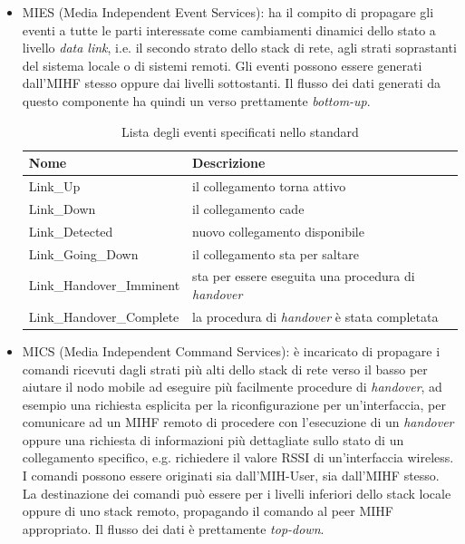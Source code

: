 \begin{itemize}
\item MIES (Media Independent Event Services): ha il compito di propagare gli eventi a tutte le parti interessate come cambiamenti dinamici dello stato a livello {\em data link}, i.e. il secondo strato dello stack di rete, agli strati soprastanti del sistema locale o di sistemi remoti. Gli eventi possono essere generati dall'MIHF stesso oppure dai livelli sottostanti. Il flusso dei dati generati da questo componente ha quindi un verso prettamente {\em bottom-up}.

\begin{table}[h]
\begin{tabular}{p{}|p{}}
\toprule
\textbf{Nome} & \textbf{Descrizione} \\
\midrule
Link\_Up & il collegamento torna attivo \\
\hline
Link\_Down & il collegamento cade  \\
\hline
Link\_Detected & nuovo collegamento disponibile \\
\hline
Link\_Going\_Down & il collegamento sta per saltare \\
\hline
Link\_Handover\_Imminent & sta per essere eseguita una procedura di {\em handover} \\
\hline
Link\_Handover\_Complete & la procedura di {\em handover} è stata completata \\
\bottomrule
\end{tabular}
\caption{Lista degli eventi specificati nello standard}
\label{mihevents}
\end{table}

\item MICS (Media Independent Command Services): è incaricato di propagare i comandi ricevuti dagli strati più alti dello stack di rete verso il basso per aiutare il nodo mobile ad eseguire più facilmente procedure di {\em handover}, ad esempio una richiesta esplicita per la riconfigurazione per un'interfaccia, per comunicare ad un MIHF remoto di procedere con l'esecuzione di un {\em handover} oppure una richiesta di informazioni più dettagliate sullo stato di un collegamento specifico, e.g. richiedere il valore RSSI di un'interfaccia wireless. I comandi possono essere originati sia dall'MIH-User, sia dall'MIHF stesso. La destinazione dei comandi può essere per i livelli inferiori dello stack locale oppure di uno stack remoto, propagando il comando al peer MIHF appropriato. Il flusso dei dati è prettamente {\em top-down}.


\end{itemize}

